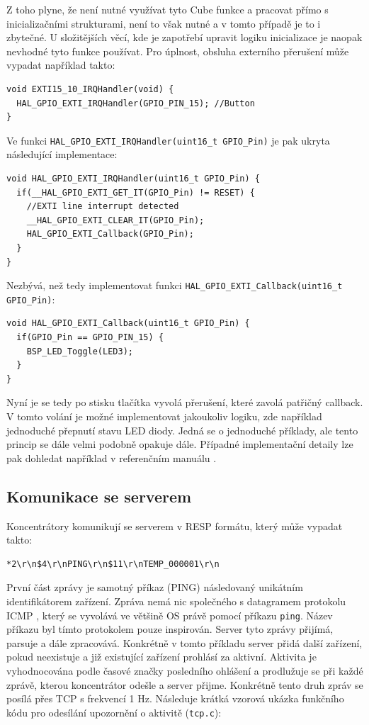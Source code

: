 Z toho plyne, že není nutné využívat tyto Cube funkce a pracovat přímo s inicializačními strukturami, není to však nutné a v tomto případě je to i zbytečné. U složitějších věcí, kde je zapotřebí upravit logiku inicializace je naopak nevhodné tyto funkce používat. Pro úplnost, obsluha externího přerušení může vypadat například takto:

\begin{verbatim}
void EXTI15_10_IRQHandler(void) {
  HAL_GPIO_EXTI_IRQHandler(GPIO_PIN_15); //Button
}
\end{verbatim}

Ve funkci \texttt{HAL\_GPIO\_EXTI\_IRQHandler(uint16\_t GPIO\_Pin)} je pak u\-kry\-ta následující implementace:

\begin{verbatim}
void HAL_GPIO_EXTI_IRQHandler(uint16_t GPIO_Pin) {
  if(__HAL_GPIO_EXTI_GET_IT(GPIO_Pin) != RESET) {
    //EXTI line interrupt detected
    __HAL_GPIO_EXTI_CLEAR_IT(GPIO_Pin);
    HAL_GPIO_EXTI_Callback(GPIO_Pin);
  }
}
\end{verbatim}

Nezbývá, než tedy implementovat funkci \texttt{HAL\_GPIO\_EXTI\_Callback(uint16\_t GPIO\_Pin)}:

\begin{verbatim}
void HAL_GPIO_EXTI_Callback(uint16_t GPIO_Pin) {
  if(GPIO_Pin == GPIO_PIN_15) {
    BSP_LED_Toggle(LED3);
  }
}
\end{verbatim}

Nyní je se tedy po stisku tlačítka vyvolá přerušení, které zavolá patřičný callback. V tomto volání je možné implementovat jakoukoliv logiku, zde například jednoduché přepnutí stavu LED diody. Jedná se o jednoduché příklady, ale tento princip se dále velmi podobně opakuje dále. Případné implementační detaily lze pak dohledat například v referenčním manuálu \cite{manual}.

\subsection{Komunikace se serverem}
Koncentrátory komunikují se serverem v RESP  formátu, který může vypadat takto:

\begin{verbatim}
*2\r\n$4\r\nPING\r\n$11\r\nTEMP_000001\r\n
\end{verbatim}

První část zprávy je samotný příkaz (PING) následovaný unikátním identifikátorem zařízení. Zpráva  nemá nic společného s datagramem  protokolu ICMP \cite{icmp}, který se vyvolává ve většině OS právě pomocí příkazu \texttt{ping}. Název příkazu byl tímto protokolem pouze inspirován. Server tyto zprávy přijímá, parsuje a dále zpracovává. Konkrétně v tomto příkladu server přidá další zařízení, pokud neexistuje a již existující zařízení prohlásí za aktivní. Aktivita je vyhodnocována podle časové značky posledního ohlášení a prodlužuje se při každé zprávě, kterou koncentrátor odešle a server přijme. Konkrétně tento druh zpráv se posílá přes TCP s frekvencí 1 Hz. Následuje krátká vzorová ukázka funkčního kódu pro odesílání upozornění o aktivitě (\texttt{tcp.c}):

